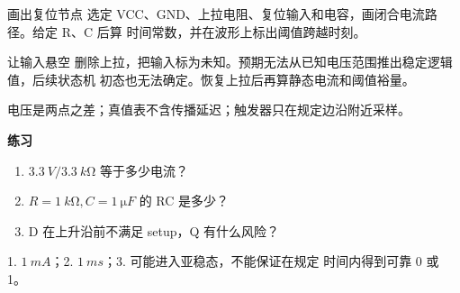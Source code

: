 
\begin{experimentbox}{画出复位节点}
选定 VCC、GND、上拉电阻、复位输入和电容，画闭合电流路径。给定 R、C 后算
时间常数，并在波形上标出阈值跨越时刻。
\end{experimentbox}

\begin{faultinjectionbox}{让输入悬空}
删除上拉，把输入标为未知。预期无法从已知电压范围推出稳定逻辑值，后续状态机
初态也无法确定。恢复上拉后再算静态电流和阈值裕量。
\end{faultinjectionbox}

\begin{pitfallbox}
电压是两点之差；真值表不含传播延迟；触发器只在规定边沿附近采样。
\end{pitfallbox}

\textbf{练习}
\begin{enumerate}[leftmargin=2.2em]
  \item \(\SI{3.3}{V}/\SI{3.3}{k\ohm}\) 等于多少电流？
  \item \(R=\SI{1}{k\ohm},C=\SI{1}{\micro F}\) 的 RC 是多少？
  \item D 在上升沿前不满足 setup，Q 有什么风险？
\end{enumerate}
\begin{answerbox}
1. \(\SI{1}{mA}\)；2. \(\SI{1}{ms}\)；3. 可能进入亚稳态，不能保证在规定
时间内得到可靠 0 或 1。
\end{answerbox}
